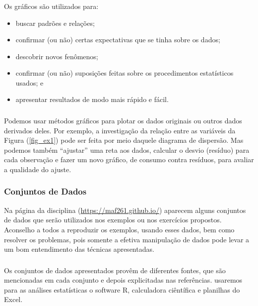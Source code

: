 \documentclass[14pt,aspectratio=1610]{beamer}
\begin{document}
\begin{frame}{}
\frametitle{}
\begin{block}{}
\justifying
Os gráficos são utilizados para:
\begin{itemize}
\item buscar padrões e relações;
\item confirmar (ou não) certas expectativas que se tinha sobre os dados;
\item descobrir novos fenômenos;
\item confirmar (ou não) suposições feitas sobre os procedimentos estatísticos usados; e
\item apresentar resultados de modo mais rápido e fácil.
\end{itemize}
\end{block}
\end{frame}

\begin{frame}{}
\frametitle{}
\begin{block}{}
\justifying
Podemos usar métodos gráficos para plotar os dados originais ou outros dados derivados
deles. Por exemplo, a investigação da relação entre as variáveis da Figura (\ref{fig_ex1}) pode ser feita por meio daquele diagrama de dispersão. Mas podemos também “ajustar” uma reta aos dados, calcular o desvio (resíduo) para cada observação e fazer um novo gráfico, de consumo contra resíduos, para avaliar a qualidade do ajuste.
\end{block}
\end{frame}

\begin{frame}{}
\frametitle{Conjuntos de Dados}
\begin{block}{}
\justifying
Na página da disciplina (\url{https://maf261.github.io/}) aparecem alguns conjuntos de dados que serão utilizados nos exemplos ou nos exercícios propostos. Aconselho a todos a reproduzir os exemplos, usando esses dados, bem como resolver os problemas, pois somente a efetiva manipulação de dados pode levar a um bom entendimento das técnicas apresentadas.
\end{block}
\end{frame}

\begin{frame}{}
\frametitle{}
\begin{block}{}
\justifying
Os conjuntos de dados apresentados provêm de diferentes fontes, que são mencionadas
em cada conjunto e depois explicitadas nas referências. usaremos para as análises estatísticas o software R, calculadora ciêntífica e planilhas do Excel. 
\end{block}
\end{frame}
\end{document}
